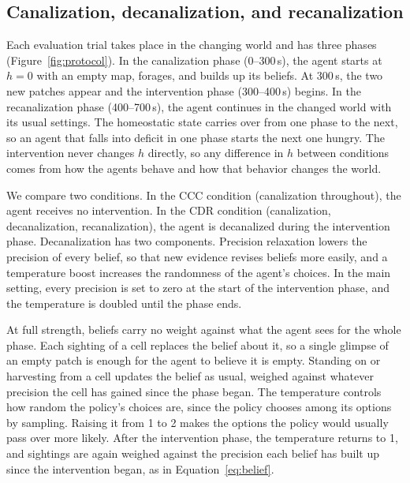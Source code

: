 \documentclass[12pt,fleqn]{article}
\begin{document}
\subsection{Canalization, decanalization, and recanalization}\label{sec:protocol}

Each evaluation trial takes place in the changing world and has three phases (Figure~\ref{fig:protocol}). In the canalization phase (0--300\,s), the agent starts at $h=0$ with an empty map, forages, and builds up its beliefs. At 300\,s, the two new patches appear and the intervention phase (300--400\,s) begins. In the recanalization phase (400--700\,s), the agent continues in the changed world with its usual settings. The homeostatic state carries over from one phase to the next, so an agent that falls into deficit in one phase starts the next one hungry. The intervention never changes $h$ directly, so any difference in $h$ between conditions comes from how the agents behave and how that behavior changes the world.

We compare two conditions. In the CCC condition (canalization throughout), the agent receives no intervention. In the CDR condition (canalization, decanalization, recanalization), the agent is decanalized during the intervention phase. Decanalization has two components. Precision relaxation lowers the precision of every belief, so that new evidence revises beliefs more easily, and a temperature boost increases the randomness of the agent's choices. In the main setting, every precision is set to zero at the start of the intervention phase, and the temperature is doubled until the phase ends.

At full strength, beliefs carry no weight against what the agent sees for the whole phase. Each sighting of a cell replaces the belief about it, so a single glimpse of an empty patch is enough for the agent to believe it is empty. Standing on or harvesting from a cell updates the belief as usual, weighed against whatever precision the cell has gained since the phase began. The temperature controls how random the policy's choices are, since the policy chooses among its options by sampling. Raising it from 1 to 2 makes the options the policy would usually pass over more likely. After the intervention phase, the temperature returns to 1, and sightings are again weighed against the precision each belief has built up since the intervention began, as in Equation~\ref{eq:belief}.
\end{document}
